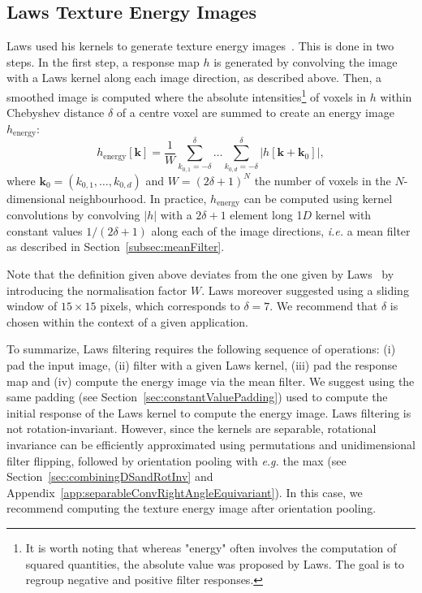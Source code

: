 \documentclass[fleqn,a4paper,oneside,openany]{book}
\begin{document}
\subsection{Laws Texture Energy Images}
%
Laws used his kernels to generate texture energy images~\cite{Law1980}. This is done in two steps. In the first step, a response map $h$ is generated by convolving the image with a Laws kernel along each image direction, as described above. Then, a smoothed image is computed where the absolute intensities\footnote{It is worth noting that whereas "energy" often involves the computation of squared quantities, the absolute value was proposed by Laws. The goal is to regroup negative and positive filter responses.} of voxels in $h$ within Chebyshev distance $\delta$ of a centre voxel are summed to create an energy image $h_{\text{energy}}$:
$$h_{\text{energy}}[\boldsymbol{k}]=\frac{1}{W}\sum_{k_{0,1}=-\delta}^{\delta}
\dots
\sum_{k_{0,d}=-\delta}^{\delta}\left|h[\boldsymbol{k}+\boldsymbol{k}_0]\right|,$$
where $\boldsymbol{k}_0=(k_{0,1},\dots,k_{0,d})$ and $W=\left(2\delta+1\right)^N$ the number of voxels in the $N$-dimensional neighbourhood.
In practice, \(h_{\text{energy}}\) can be computed using kernel convolutions by convolving $|h|$ with a $2\delta+1$ element long 1$D$ kernel with constant values $1/\left(2\delta+1\right)$ along each of the image directions, \textit{i.e.} a mean filter as described in Section~\ref{subsec:meanFilter}.

Note that the definition given above deviates from the one given by Laws~\cite{Law1980} by introducing the normalisation factor \(W\).
Laws moreover suggested using a sliding window of $15\times 15$ pixels, which corresponds to $\delta=7$.
We recommend that $\delta$ is chosen within the context of a given application.

To summarize, Laws filtering requires the following sequence of operations: (i) pad the input image, (ii) filter with a given Laws kernel, (iii) pad the response map and (iv) compute the energy image via the mean filter.
We suggest using the same padding (see Section~\ref{sec:constantValuePadding}) used to compute the initial response of the Laws kernel to compute the energy image.
Laws filtering is not rotation-invariant.
However, since the kernels are separable, rotational invariance can be efficiently approximated using permutations and unidimensional filter flipping, followed by orientation pooling with \textit{e.g.} the max (see Section~\ref{sec:combiningDSandRotInv} and Appendix~\ref{app:separableConvRightAngleEquivariant}).
In this case, we recommend computing the texture energy image after orientation pooling.
\end{document}
